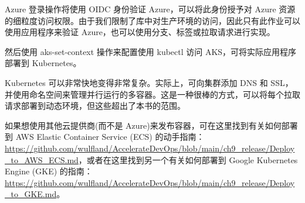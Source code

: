 
Azure 登录操作将使用 OIDC 身份验证 Azure，可以将此身份授予对 Azure 资源的细粒度访问权限。由于我们限制了库中对生产环境的访问，因此只有此作业可以使用应用程序来验证 Azure，也可以使用分支、标签或拉取请求进行实现。

然后使用 aks-set-context 操作来配置使用 kubectl 访问 AKS，可将实际应用程序部署到 Kubernetes。


Kubernetes 可以非常快地变得非常复杂。实际上，可向集群添加 DNS 和 SSL，并使用命名空间来管理并行运行的多容器。这是一种很棒的方式，可以将每个拉取请求部署到动态环境，但这些超出了本书的范围。

如果想使用其他云提供商(而不是 Azure)来发布容器，可在这里找到有关如何部署到 AWS Elastic Container Service (ECS) 的动手指南：\url{https://github.com/wulfland/AccelerateDevOps/blob/main/ch9_release/Deploy_to_AWS_ECS.md}，或者在这里找到另一个有关如何部署到 Google Kubernetes Engine (GKE) 的指南：\url{https://github.com/wulfland/AccelerateDevOps/blob/main/ch9_release/Deploy_to_GKE.md}。